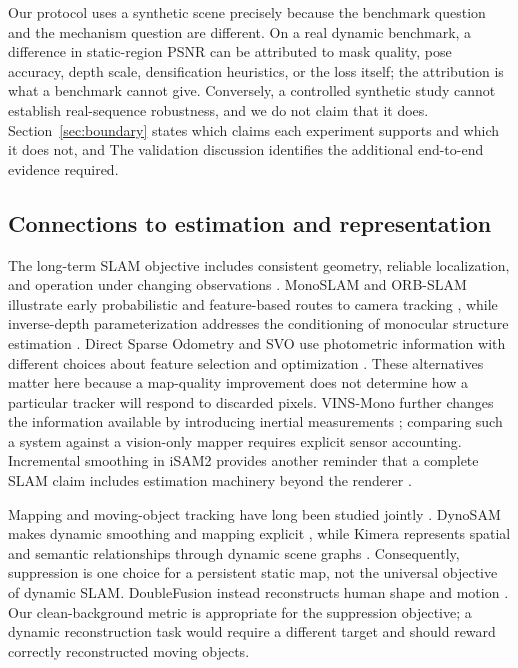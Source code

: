 \documentclass[10pt,conference]{IEEEtran}
\begin{document}
Our protocol uses a synthetic scene precisely because the benchmark question and the mechanism question are different. On a real dynamic benchmark, a difference in static-region PSNR can be attributed to mask quality, pose accuracy, depth scale, densification heuristics, or the loss itself; the attribution is what a benchmark cannot give. Conversely, a controlled synthetic study cannot establish real-sequence robustness, and we do not claim that it does. Section~\ref{sec:boundary} states which claims each experiment supports and which it does not, and The validation discussion identifies the additional end-to-end evidence required.


\subsection{Connections to estimation and representation}
The long-term SLAM objective includes consistent geometry, reliable localization, and operation under changing observations \cite{cadena2016}. MonoSLAM and ORB-SLAM illustrate early probabilistic and feature-based routes to camera tracking \cite{monoslam2007,orb2015}, while inverse-depth parameterization addresses the conditioning of monocular structure estimation \cite{inverse2008}. Direct Sparse Odometry and SVO use photometric information with different choices about feature selection and optimization \cite{dso2018,svo2017}. These alternatives matter here because a map-quality improvement does not determine how a particular tracker will respond to discarded pixels. VINS-Mono further changes the information available by introducing inertial measurements \cite{vins2018}; comparing such a system against a vision-only mapper requires explicit sensor accounting. Incremental smoothing in iSAM2 provides another reminder that a complete SLAM claim includes estimation machinery beyond the renderer \cite{isam2012}.

Mapping and moving-object tracking have long been studied jointly \cite{dynamicslam2007}. DynoSAM makes dynamic smoothing and mapping explicit \cite{dynosam2024}, while Kimera represents spatial and semantic relationships through dynamic scene graphs \cite{kimera2022}. Consequently, suppression is one choice for a persistent static map, not the universal objective of dynamic SLAM. DoubleFusion instead reconstructs human shape and motion \cite{doublefusion2018}. Our clean-background metric is appropriate for the suppression objective; a dynamic reconstruction task would require a different target and should reward correctly reconstructed moving objects.
\end{document}
